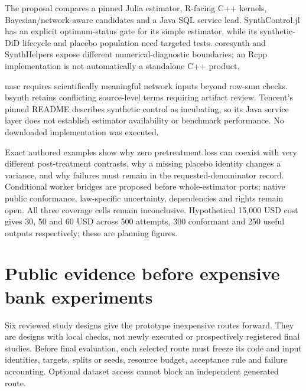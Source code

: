 The proposal compares a pinned Julia estimator, R-facing C++ kernels,
Bayesian/network-aware candidates and a Java SQL service lead.
SynthControl.jl has an explicit optimum-status gate for its simple
estimator, while its synthetic-DiD lifecycle and placebo population need
targeted tests. coresynth and SynthHelpers expose different
numerical-diagnostic boundaries; an Rcpp implementation is not
automatically a standalone C++ product.
\citep{exec25_synthcross_julia,exec25_synthcross_core,exec25_synthcross_helpers}

nasc requires scientifically meaningful network inputs beyond row-sum
checks. bsynth retains conflicting source-level terms requiring artifact
review. Tencent's pinned README describes synthetic control as
incubating, so its Java service layer does not establish estimator
availability or benchmark performance. No downloaded implementation was
executed.
\citep{exec25_synthcross_nasc,exec25_synthcross_bsynth,exec25_synthcross_tencent}

Exact authored examples show why zero pretreatment loss can coexist with
very different post-treatment contrasts, why a missing placebo identity
changes a variance, and why failures must remain in the
requested-denominator record. Conditional worker bridges are proposed
before whole-estimator ports; native public conformance, law-specific
uncertainty, dependencies and rights remain open. All three coverage
cells remain inconclusive. Hypothetical 15,000 USD cost gives 30, 50 and
60 USD across 500 attempts, 300 conformant and 250 useful outputs
respectively; these are planning figures.
\citep{exec25_synthcross_choice}

\hypertarget{public-evidence-before-expensive-bank-experiments}{%
\section{Public evidence before expensive bank
experiments}\label{public-evidence-before-expensive-bank-experiments}}

Six reviewed study designs give the prototype inexpensive routes
forward. They are designs with local checks, not newly executed or
prospectively registered final studies. Before final evaluation, each
selected route must freeze its code and input identities, targets,
splits or seeds, resource budget, acceptance rule and failure
accounting. Optional dataset access cannot block an independent
generated route. \citep{sp13_public}

